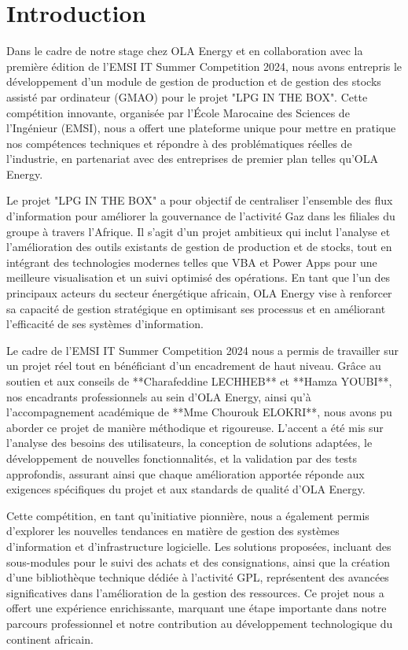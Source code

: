 \documentclass[a4paper,12pt]{report} %
\begin{document}
\chapter*{Introduction} %

Dans le cadre de notre stage chez OLA Energy et en collaboration avec la première édition de l'EMSI IT Summer Competition 2024, nous avons entrepris le développement d'un module de gestion de production et de gestion des stocks assisté par ordinateur (GMAO) pour le projet "LPG IN THE BOX". Cette compétition innovante, organisée par l'École Marocaine des Sciences de l'Ingénieur (EMSI), nous a offert une plateforme unique pour mettre en pratique nos compétences techniques et répondre à des problématiques réelles de l'industrie, en partenariat avec des entreprises de premier plan telles qu'OLA Energy.

Le projet "LPG IN THE BOX" a pour objectif de centraliser l’ensemble des flux d’information pour améliorer la gouvernance de l’activité Gaz dans les filiales du groupe à travers l'Afrique. Il s’agit d’un projet ambitieux qui inclut l’analyse et l'amélioration des outils existants de gestion de production et de stocks, tout en intégrant des technologies modernes telles que VBA et Power Apps pour une meilleure visualisation et un suivi optimisé des opérations. En tant que l'un des principaux acteurs du secteur énergétique africain, OLA Energy vise à renforcer sa capacité de gestion stratégique en optimisant ses processus et en améliorant l'efficacité de ses systèmes d’information.

Le cadre de l'EMSI IT Summer Competition 2024 nous a permis de travailler sur un projet réel tout en bénéficiant d’un encadrement de haut niveau. Grâce au soutien et aux conseils de **Charafeddine LECHHEB** et **Hamza YOUBI**, nos encadrants professionnels au sein d'OLA Energy, ainsi qu'à l'accompagnement académique de **Mme Chourouk ELOKRI**, nous avons pu aborder ce projet de manière méthodique et rigoureuse. L'accent a été mis sur l'analyse des besoins des utilisateurs, la conception de solutions adaptées, le développement de nouvelles fonctionnalités, et la validation par des tests approfondis, assurant ainsi que chaque amélioration apportée réponde aux exigences spécifiques du projet et aux standards de qualité d'OLA Energy.

Cette compétition, en tant qu'initiative pionnière, nous a également permis d'explorer les nouvelles tendances en matière de gestion des systèmes d'information et d'infrastructure logicielle. Les solutions proposées, incluant des sous-modules pour le suivi des achats et des consignations, ainsi que la création d’une bibliothèque technique dédiée à l’activité GPL, représentent des avancées significatives dans l'amélioration de la gestion des ressources. Ce projet nous a offert une expérience enrichissante, marquant une étape importante dans notre parcours professionnel et notre contribution au développement technologique du continent africain.
\end{document}
